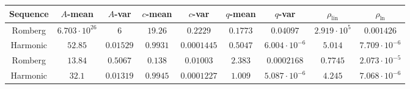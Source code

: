 \begin{table}[H]
    \centering
    \small
    \begin{tabular}{c||c|c|c|c|c|c|c|c}
Sequence & \(A\)-mean & \(A\)-var & \(c\)-mean & \(c\)-var & \(q\)-mean & \(q\)-var & \(\rho_{\operatorname{lin}}\) & \(\rho_{\ln}\)\\\hline
\rowcolor{red}
Romberg & \(6.703\cdot 10^{26}\) & \(6\) & \(19.26\) & \(0.2229\) & \(0.1773\) & \(0.04097\) & \(2.919\cdot 10^5\) & \(0.001426\) \\
\rowcolor{green}
Harmonic & \(52.85\) & \(0.01529\) & \(0.9931\) & \(0.0001445\) & \(0.5047\) & \(6.004\cdot 10^{-6}\) & \(5.014\) & \(7.709\cdot 10^{-6}\) \\
\rowcolor{green}
Romberg & \(13.84\) & \(0.5067\) & \(0.138\) & \(0.01003\) & \(2.383\) & \(0.0002168\) & \(0.7745\) & \(2.073\cdot 10^{-5}\) \\
\rowcolor{green}
Harmonic & \(32.1\) & \(0.01319\) & \(0.9945\) & \(0.0001227\) & \(1.009\) & \(5.087\cdot 10^{-6}\) & \(4.245\) & \(7.068\cdot 10^{-6}\) \\
    \end{tabular}
    \label{tab:my_label}
\end{table}

